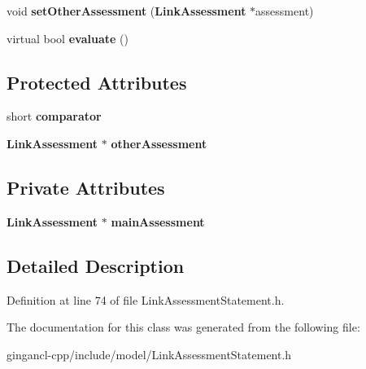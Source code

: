 \begin{CompactItemize}
\item 
void \textbf{setOtherAssessment} ({\bf LinkAssessment} $\ast$assessment)\label{classbr_1_1pucrio_1_1telemidia_1_1ginga_1_1ncl_1_1model_1_1link_1_1LinkAssessmentStatement_cdf36cb246c4d59a7eb8fb5dc019f9de}

\item 
virtual bool \textbf{evaluate} ()\label{classbr_1_1pucrio_1_1telemidia_1_1ginga_1_1ncl_1_1model_1_1link_1_1LinkAssessmentStatement_b3e1146e41a1f8028564611511a09420}

\end{CompactItemize}
\subsection*{Protected Attributes}
\begin{CompactItemize}
\item 
short {\bf comparator}\label{classbr_1_1pucrio_1_1telemidia_1_1ginga_1_1ncl_1_1model_1_1link_1_1LinkAssessmentStatement_b2a4eae1b396bbd3e4067e165fde9bf8}

\item 
{\bf LinkAssessment} $\ast$ {\bf otherAssessment}\label{classbr_1_1pucrio_1_1telemidia_1_1ginga_1_1ncl_1_1model_1_1link_1_1LinkAssessmentStatement_38c444c89dbba988fca279f9a1cd97ad}

\end{CompactItemize}
\subsection*{Private Attributes}
\begin{CompactItemize}
\item 
{\bf LinkAssessment} $\ast$ {\bf mainAssessment}\label{classbr_1_1pucrio_1_1telemidia_1_1ginga_1_1ncl_1_1model_1_1link_1_1LinkAssessmentStatement_393dee8134d6b560af8f0a6addf728c3}

\end{CompactItemize}


\subsection{Detailed Description}




Definition at line 74 of file LinkAssessmentStatement.h.

The documentation for this class was generated from the following file:\begin{CompactItemize}
\item 
gingancl-cpp/include/model/LinkAssessmentStatement.h\end{CompactItemize}
